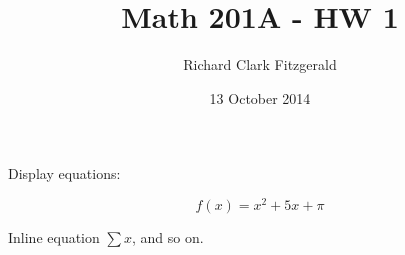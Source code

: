 \documentclass[12pt]{article}
\title{Math 201A - HW 1}
\date{13 October 2014}
\author{Richard Clark Fitzgerald}
\begin{document}
\maketitle

\section{}

Display equations:

\[
    f(x) = x^2 + 5x + \pi
\]

Inline equation $\sum x$, and so on.
\end{document}
